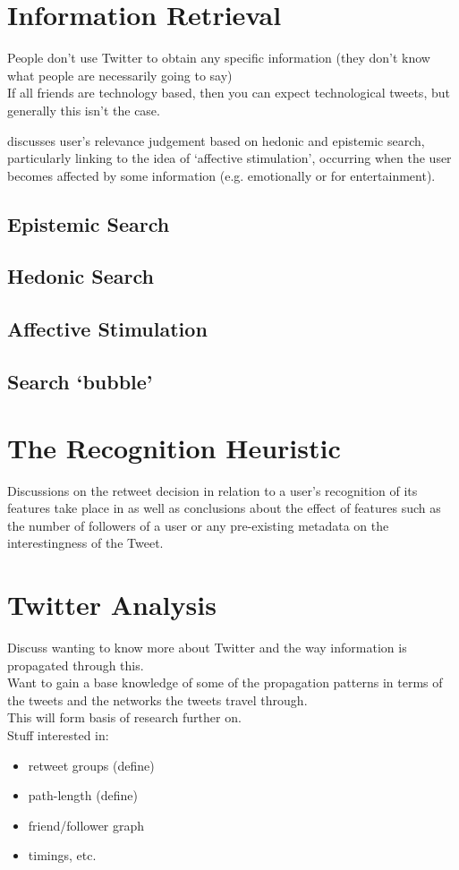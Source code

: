 \section{Information Retrieval}
People don't use Twitter to obtain any specific information (they don't know what people are necessarily going to say) \\
If all friends are technology based, then you can expect technological tweets, but generally this isn't the case.

\cite{xu07} discusses user's relevance judgement based on hedonic and epistemic search, particularly linking to the idea of `affective stimulation', occurring when the user becomes affected by some information (e.g. emotionally or for entertainment).
\subsection{Epistemic Search}

\subsection{Hedonic Search}

\subsection{Affective Stimulation}

\subsection{Search `bubble'}

\section{The Recognition Heuristic} 
Discussions on the retweet decision in relation to a user's recognition of its features take place in \cite{chorley12} as well as conclusions about the effect of features such as the number of followers of a user or any pre-existing metadata on the interestingness of the Tweet.\\




\section{Twitter Analysis}
Discuss wanting to know more about Twitter and the way information is propagated through this. \\
Want to gain a base knowledge of some of the propagation patterns in terms of the tweets and the networks the tweets travel through. \\
This will form basis of research further on. \\ 
Stuff interested in:
\begin{itemize}
\item retweet groups (define)
\item path-length (define)
\item friend/follower graph 
\item timings, etc.
\end{itemize}

